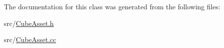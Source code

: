 

The documentation for this class was generated from the following files\+:\begin{DoxyCompactItemize}
\item 
src/\hyperlink{CubeAsset_8h}{Cube\+Asset.\+h}\item 
src/\hyperlink{CubeAsset_8cc}{Cube\+Asset.\+cc}\end{DoxyCompactItemize}
